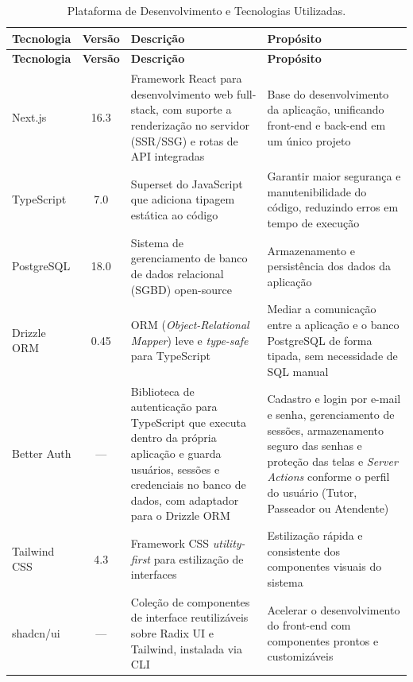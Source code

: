 \begin{footnotesize}
\begin{longtable}{|p{2.5cm}|c|p{5cm}|p{5.5cm}|}
	\caption{Plataforma de Desenvolvimento e Tecnologias Utilizadas.}	
	\label{tabela-plataforma}\\\hline

	\rowcolor{lightgray}
	\textbf{Tecnologia} & \textbf{Versão} & \textbf{Descrição} & \textbf{Propósito} \\\hline 
	\endfirsthead
	\hline
	\rowcolor{lightgray}
	\textbf{Tecnologia} & \textbf{Versão} & \textbf{Descrição} & \textbf{Propósito} \\\hline 
	\endhead
		
	Next.js & 16.3 & Framework React para desenvolvimento web full-stack, com suporte a renderização no servidor (SSR/SSG) e rotas de API integradas & Base do desenvolvimento da aplicação, unificando front-end e back-end em um único projeto \\ \hline
	TypeScript & 7.0 & Superset do JavaScript que adiciona tipagem estática ao código & Garantir maior segurança e manutenibilidade do código, reduzindo erros em tempo de execução \\ \hline
	PostgreSQL & 18.0 & Sistema de gerenciamento de banco de dados relacional (SGBD) open-source & Armazenamento e persistência dos dados da aplicação \\ \hline
	Drizzle ORM & 0.45 & ORM (\textit{Object-Relational Mapper}) leve e \textit{type-safe} para TypeScript & Mediar a comunicação entre a aplicação e o banco PostgreSQL de forma tipada, sem necessidade de SQL manual \\ \hline
	Better Auth & --- & Biblioteca de autenticação para TypeScript que executa dentro da própria aplicação e guarda usuários, sessões e credenciais no banco de dados, com adaptador para o Drizzle ORM & Cadastro e login por e-mail e senha, gerenciamento de sessões, armazenamento seguro das senhas e proteção das telas e \textit{Server Actions} conforme o perfil do usuário (Tutor, Passeador ou Atendente) \\ \hline
	Tailwind CSS & 4.3 & Framework CSS \textit{utility-first} para estilização de interfaces & Estilização rápida e consistente dos componentes visuais do sistema \\ \hline
	shadcn/ui & --- & Coleção de componentes de interface reutilizáveis sobre Radix UI e Tailwind, instalada via CLI & Acelerar o desenvolvimento do front-end com componentes prontos e customizáveis \\ \hline

\end{longtable}
\end{footnotesize}



